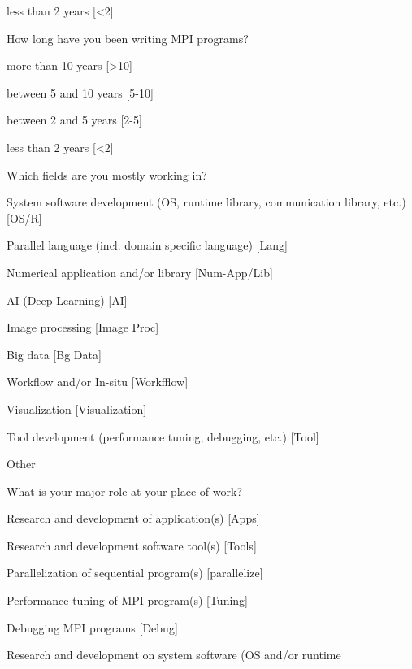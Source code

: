 \documentclass[preprint,5p,times]{elsarticle}
\begin{document}
{{\begin{description}
\begin{inparaenum}[{\bf C}1)]
    \item less than 2 years [\textless 2]
    \end{inparaenum}
  \item[Q6:] How long have you been writing MPI programs?
    \begin{inparaenum}[{\bf C}1)]
    \item more than 10 years [\textgreater10]
    \item between 5 and 10 years [5-10]
    \item between 2 and 5 years [2-5]
    \item less than 2 years [\textless 2]
    \end{inparaenum}
  \item[Q7*:] Which fields are you mostly working in?
    \begin{inparaenum}[{\bf C}1)]
    \item System software development (OS, runtime library, communication
      library, etc.) [OS/R]
    \item Parallel language (incl. domain specific language) [Lang]
    \item Numerical application and/or library [Num-App/Lib]
    \item AI (Deep Learning) [AI]
    \item Image processing [Image Proc]
    \item Big data [Bg Data]
    \item Workflow and/or In-situ [Workfflow]
    \item Visualization [Visualization]
    \item Tool development (performance tuning, debugging, etc.) [Tool]
    \item Other
    \end{inparaenum}
  \item[Q8*:] What is your major role at your place of work?
    \begin{inparaenum}[{\bf C}1)]
    \item Research and development of application(s) [Apps]
    \item Research and development software tool(s) [Tools]
    \item Parallelization of sequential program(s) [parallelize]
    \item Performance tuning of MPI program(s) [Tuning]
    \item Debugging MPI programs [Debug]
    \item Research and development on system software (OS and/or runtime

\end{inparaenum}
\end{description}}}
\end{document}
